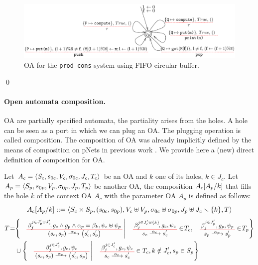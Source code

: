 \documentclass[runningheads]{llncs}
\begin{document}
\begin{example}
\begin{figure}[!tb]
 \centering
   \includegraphics[width=.99\textwidth]{Figures/FIFORing.pdf}
   \caption{OA for the \texttt{prod-cons} system using FIFO circular buffer.
    \label{Fig:RefineOA}} 
\end{figure}
\qed
\end{example}





\paragraph{Open automata composition.}

OA are partially specified automata, the partiality arises  from the holes.
A hole can be seen as a port in which we can plug an OA.
The plugging operation is called composition.
The composition of OA was already implicitly defined by the means of composition on pNets in previous work \cite{henrio:01299562}. We provide here a (new) direct definition of composition for OA.




\begin{definition}[Composition of OA] \label{Def:CompOA}
Let  \(A_c = \OAg[c]\) be an OA and $k$ one of its holes, \(k \in J_c\). Let \(A_p = \OAg[p]\) be another OA,  the composition $A_c\subst{A_p}{k}$ that fills the hole $k$ of the context OA \(A_c\) with the parameter OA \(A_p\) is defined as follows:
\[A_c\subst{A_p}{k} ::=  \OA{S_c \times S_p}{\mpar{s_{0c}, s_{0p}}}{V_c \uplus V_p}{\sigma_{0c} \uplus \sigma_{0p}}{J_p \uplus J_c \setminus \mbrc{k}}{T} \] 
\begin{align*}
T\!=& \mset{\OT{\mpar{s_c, s_p}}{\mpar{s'_c, s'_p}}{\alpha_c}{\beta_j^{j \in J'_p \uplus J'_c}\!}{g_c \wedge g_p \wedge \alpha_p = \beta_k}{\psi_c \uplus \psi_p}}{ \OT{s_c}{s'_c}{\alpha_c}{\beta_j^{j \in J'_c \uplus \mbrc{k} }\!}{g_c}{\psi_c} \in\! T_c, \OTx{p}{}{}{p} \in\! T_p} \\
	& \cup \mset{\OT{\mpar{s_c, s_p}}{\mpar{s'_c, s_p}}{\alpha_c}{\beta_j^{j \in J'_c}}{g_c}{\psi_c}}{\OTx{c}{}{}{c} \in T_c, k \notin J'_c, s_p \in S_p}
\end{align*}
\end{definition}
\end{document}
